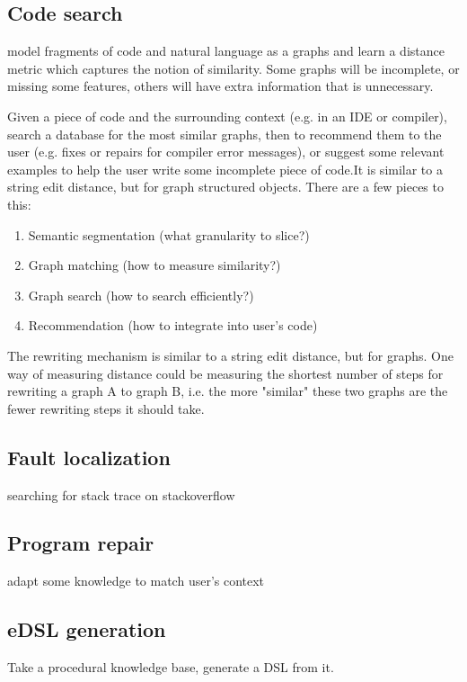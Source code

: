 \documentclass[11pt]{article}
\begin{document}
    \subsection{Code search}

    model fragments of code and natural language as a graphs and learn a distance metric which captures the notion of similarity. Some graphs will be incomplete, or missing some features, others will have extra information that is unnecessary.

    Given a piece of code and the surrounding context (e.g. in an IDE or compiler), search a database for the most similar graphs, then to recommend them to the user (e.g. fixes or repairs for compiler error messages), or suggest some relevant examples to help the user write some incomplete piece of code.It is similar to a string edit distance, but for graph structured objects. There are a few pieces to this:

    \begin{enumerate}
        \item Semantic segmentation (what granularity to slice?)
        \item Graph matching (how to measure similarity?)
        \item Graph search (how to search efficiently?)
        \item Recommendation (how to integrate into user's code)
    \end{enumerate}

    The rewriting mechanism is similar to a string edit distance, but for graphs. One way of measuring distance could be measuring the shortest number of steps for rewriting a graph A to graph B, i.e. the more "similar" these two graphs are the fewer rewriting steps it should take.

    \subsection{Fault localization}

    searching for stack trace on stackoverflow

    \subsection{Program repair}

    adapt some knowledge to match user's context

    \subsection{eDSL generation}

    Take a procedural knowledge base, generate a DSL from it.

    \pagebreak
    
    
\end{document}
